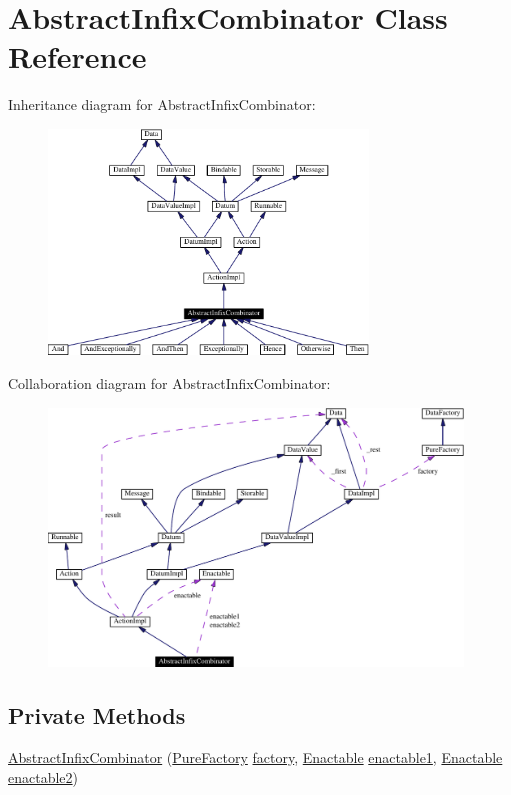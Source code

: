 \hypertarget{classAbstractInfixCombinator}{
\section{Abstract\-Infix\-Combinator  Class Reference}
\label{classAbstractInfixCombinator}
}
Inheritance diagram for Abstract\-Infix\-Combinator:\begin{figure}[H]
\begin{center}
\leavevmode
\includegraphics[width=241pt]{classAbstractInfixCombinator__inherit__graph}
\end{center}
\end{figure}
Collaboration diagram for Abstract\-Infix\-Combinator:\begin{figure}[H]
\begin{center}
\leavevmode
\includegraphics[width=312pt]{classAbstractInfixCombinator__coll__graph}
\end{center}
\end{figure}
\subsection*{Private Methods}
\begin{CompactItemize}
\item 
\hyperlink{classAbstractInfixCombinator_c0}{Abstract\-Infix\-Combinator} (\hyperlink{classPureFactory}{Pure\-Factory} \hyperlink{classDataImpl_o0}{factory}, \hyperlink{interfaceEnactable}{Enactable} \hyperlink{classAbstractInfixCombinator_o0}{enactable1}, \hyperlink{interfaceEnactable}{Enactable} \hyperlink{classAbstractInfixCombinator_o1}{enactable2})
\end{CompactItemize}
